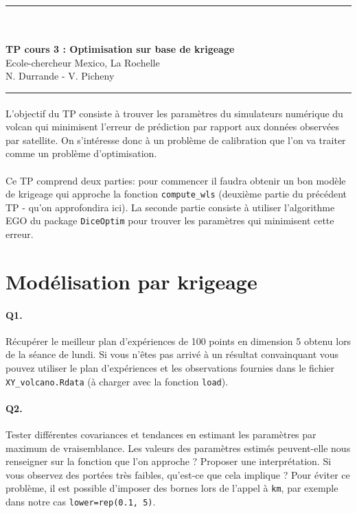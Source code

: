 \documentclass[12pt]{scrartcl}
\begin{document}
\begin{center}
	\rule{\textwidth}{1pt}
	\\ \ \\
	{\LARGE \textbf{TP cours 3 : Optimisation sur base de krigeage}}\\
	\vspace{3mm}
	{\large Ecole-chercheur Mexico, La Rochelle \\ \vspace{3mm}}
	{\normalsize N. Durrande - V. Picheny}\\
	\vspace{3mm}
	\rule{\textwidth}{1pt}
	\vspace{5mm}
\end{center}
\paragraph{}
L'objectif du TP consiste à trouver les paramètres du simulateurs numérique du volcan qui minimisent l'erreur de prédiction par rapport aux données observées par satellite. On s'intéresse donc à un problème de calibration que l'on va traiter comme un problème d'optimisation.
\paragraph{}
Ce TP comprend deux parties: pour commencer il faudra obtenir un bon modèle de krigeage qui approche la fonction \texttt{compute\_wls} (deuxième partie du précédent TP - qu'on approfondira ici). 
La seconde partie consiste à utiliser l'algorithme EGO du package \texttt{DiceOptim} pour trouver les paramètres qui minimisent cette erreur.

\section{Modélisation par krigeage}

\paragraph{Q1.} Récupérer le meilleur plan d'expériences de 100 points en dimension 5 obtenu lors de la séance de lundi. 
Si vous n'êtes pas arrivé à un résultat convainquant vous pouvez utiliser le plan d'expériences et les observations fournies dans le fichier \texttt{XY\_volcano.Rdata} (à charger avec la fonction \texttt{load}).

\paragraph{Q2.} Tester différentes covariances et tendances en estimant les paramètres par maximum de vraisemblance. Les valeurs des paramètres estimés peuvent-elle nous renseigner sur la fonction que l'on approche ? Proposer une interprétation. 
Si vous observez des portées très faibles, qu'est-ce que cela implique ? Pour éviter ce problème, il est possible d'imposer des bornes lors de l'appel à \texttt{km}, par exemple dans notre cas \texttt{lower=rep(0.1, 5)}.
\end{document}

